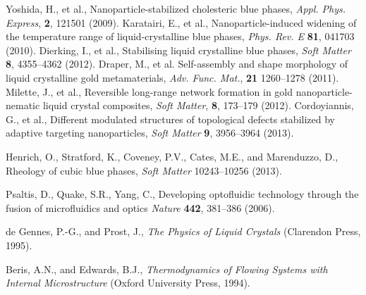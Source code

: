 \documentclass[12pt]{article}
\begin{document}
\begin{thebibliography}{99}
Yoshida, H., et al.,
Nanoparticle-stabilized cholesteric blue phases,
\textit{Appl. Phys. Express}, \textbf{2}, 121501 (2009).
%
 Karatairi, E., et al.,
Nanoparticle-induced widening of the temperature range of
liquid-crystalline blue phases, 
\textit{Phys. Rev. E} \textbf{81}, 041703 (2010).
%
%
Dierking, I., et al.,
Stabilising liquid crystalline blue phases,
\textit{Soft Matter} \textbf{8}, 4355--4362 (2012).
%
Draper, M., et al.
Self-assembly and shape morphology of liquid crystalline gold metamaterials,
\textit{Adv. Func. Mat.}, \textbf{21} 1260--1278 (2011).
%
Milette, J., et al.,
Reversible long-range network formation in gold nanoparticle-nematic
liquid crystal composites,
\textit{Soft Matter}, \textbf{8}, 173--179 (2012).
%
 Cordoyiannis, G., et al.,
Different modulated structures of topological defects stabilized by adaptive
targeting nanoparticles,
\textit{Soft Matter} \textbf{9}, 3956--3964 (2013).

Henrich, O., Stratford, K., Coveney, P.V., Cates, M.E., and Marenduzzo, D.,
Rheology of cubic blue phases,
{\it Soft Matter} 10243--10256 (2013).

 Psaltis, D., Quake, S.R., Yang, C.,
Developing optofluidic technology through the fusion of microfluidics and
optics {\it Nature} {\bf 442}, 381--386 (2006).


de Gennes, P.-G., and  Prost, J.,
{\it The Physics of Liquid Crystals} (Clarendon Press, 1995).

Beris, A.N., and  Edwards, B.J., 
{\it Thermodynamics of Flowing Systems with Internal Microstructure}
(Oxford University Press, 1994).


\end{thebibliography}
\end{document}
